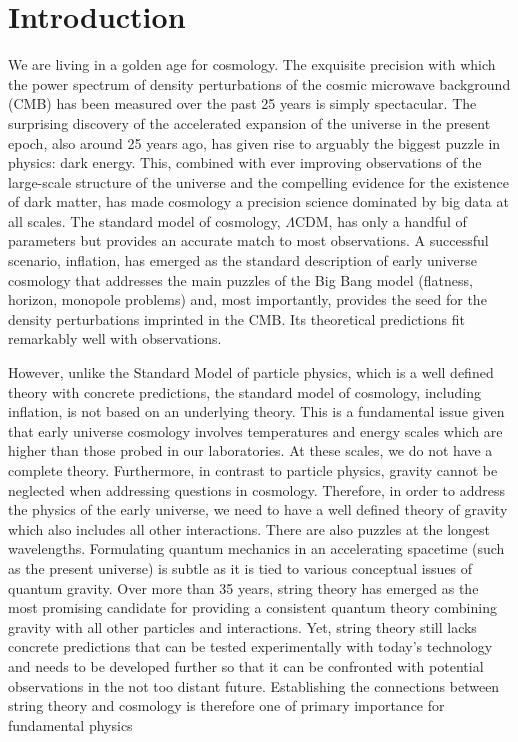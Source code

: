 \section{Introduction}



We are living in a golden age for cosmology. The exquisite precision with which the power spectrum of density perturbations of the cosmic microwave background (CMB) has been measured over the past 25 years is simply spectacular. The surprising discovery of the accelerated expansion of the universe in the present epoch, also around  25 years ago, has given rise to arguably the biggest puzzle in physics: dark energy. This, combined with ever improving observations of the large-scale structure of the universe and the compelling evidence for the existence of dark matter,  has made cosmology a precision science dominated by big data at all scales. The standard model of cosmology, $\Lambda$CDM, 
has only a handful of parameters but provides an accurate match to most observations. A successful scenario, inflation, has emerged as the standard description of early universe cosmology that addresses the main puzzles of the Big Bang model (flatness, horizon, monopole problems) and, most importantly, provides the seed for the density perturbations imprinted in the CMB. Its theoretical predictions fit remarkably well with observations.

However, unlike the Standard Model of particle physics, which is a well defined theory with concrete predictions, the standard model of cosmology, including inflation, is not based on an underlying theory. This is a fundamental  issue given  that early universe cosmology involves  temperatures and energy scales which are  higher than those probed in our  laboratories. At these scales, we do not have a complete theory. Furthermore, in contrast to particle physics, gravity cannot be neglected when addressing questions in cosmology. Therefore, in order to address the physics of the early universe, we need to have a well defined theory of gravity which also includes all other interactions. There are also puzzles at the longest wavelengths.
Formulating quantum mechanics in an accelerating spacetime (such as the present universe) is subtle as it is tied to various conceptual issues of quantum gravity.  Over more than 35 years, string theory has emerged as the most promising candidate for providing a consistent quantum 
 theory combining gravity with all other particles and interactions. Yet, string theory still lacks concrete predictions that can be tested experimentally with today's technology   and needs to be developed further so that it can be
confronted with potential observations in the not too distant future. Establishing the connections between string theory and cosmology is therefore one of primary importance for fundamental physics

